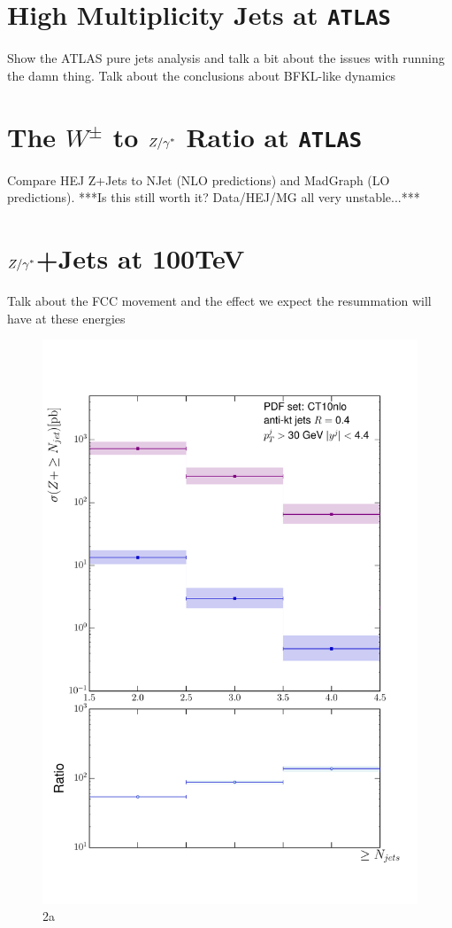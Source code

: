 \chapter{High Multiplicity Jets at \texttt{ATLAS}}
\label{chap:ATLAS}

Show the ATLAS pure jets analysis and talk a bit about the issues with running the damn thing.  Talk about the conclusions about BFKL-like dynamics

\chapter{The $W^\pm$ to $Z/\gamma^*$ Ratio at \texttt{ATLAS}}
\label{chap:WZRatio}

Compare HEJ Z+Jets to NJet (NLO predictions) and MadGraph (LO predictions).  ***Is this still worth it? Data/HEJ/MG all very unstable...***

\chapter{$Z/\gamma^*$+Jets at 100TeV}
\label{chap:100TeV}

	Talk about the FCC movement and the effect we expect the resummation will have at these energies

	\begin{figure}[h]
		\centering
		\includegraphics[width=0.8\linewidth]{Figures/ATLAS_Z_100TeV_2a.pdf}
		\caption{2a}
		\label{fig:emissionsites}
	\end{figure}

